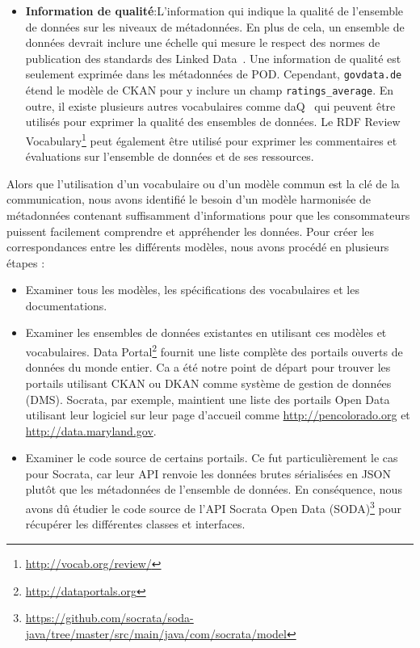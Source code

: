 \begin{itemize}
	\item \textbf{Information de qualit\'{e}}:L'information qui indique la qualit\'{e} de l'ensemble de donn\'{e}es sur les niveaux de m\'{e}tadonn\'{e}es. En plus de cela, un ensemble de donn\'{e}es devrait inclure une \'{e}chelle qui mesure le respect des normes de publication des standards des Linked Data~\cite{Berners-Lee:W3C:06}. Une information de qualit\'{e} est seulement exprim\'{e}e dans les m\'{e}tadonn\'{e}es de POD. Cependant, \texttt{govdata.de} \'{e}tend le mod\`{e}le de CKAN pour y inclure un champ \texttt{ratings\_average}. En outre, il existe plusieurs autres vocabulaires comme daQ~\cite{Debattista:WWW:14} qui peuvent \^{e}tre utilis\'{e}s pour exprimer la qualit\'{e} des ensembles de donn\'{e}es. Le RDF Review Vocabulary\footnote{\url{http://vocab.org/review/}} peut \'{e}galement \^{e}tre utilis\'{e} pour exprimer les commentaires et \'{e}valuations sur l'ensemble de donn\'{e}es et de ses ressources.
\end{itemize}

Alors que l'utilisation d'un vocabulaire ou d'un mod\`{e}le commun est la cl\'{e} de la communication, nous avons identifi\'{e} le besoin d'un mod\`{e}le harmonis\'{e}e de m\'{e}tadonn\'{e}es contenant suffisamment d'informations pour que les consommateurs puissent facilement comprendre et appr\'{e}hender les donn\'{e}es. Pour cr\'{e}er les correspondances entre les diff\'{e}rents mod\`{e}les, nous avons proc\'{e}d\'{e} en plusieurs \'{e}tapes :
\begin{itemize}
	\item Examiner tous les mod\`{e}les, les sp\'{e}cifications des vocabulaires et les documentations.
	\item Examiner les ensembles de donn\'{e}es existantes en utilisant ces mod\`{e}les et vocabulaires. Data Portal\footnote{\url{http://dataportals.org}} fournit une liste compl\`{e}te des portails ouverts de donn\'{e}es du monde entier. Ca a \'{e}t\'{e} notre point de d\'{e}part pour trouver les portails utilisant CKAN ou DKAN comme syst\`{e}me de gestion de donn\'{e}es (DMS). Socrata, par exemple, maintient une liste des portails Open Data utilisant leur logiciel sur leur page d'accueil comme \url{http://pencolorado.org} et \url{http://data.maryland.gov}.
	\item Examiner le code source de certains portails. Ce fut particuli\`{e}rement le cas pour Socrata, car leur API renvoie les donn\'{e}es brutes s\'{e}rialis\'{e}es en JSON plut\^{o}t que les m\'{e}tadonn\'{e}es de l'ensemble de donn\'{e}es. En cons\'{e}quence, nous avons dû \'{e}tudier le code source de l'API Socrata Open Data (SODA)\footnote{\url{https://github.com/socrata/soda-java/tree/master/src/main/java/com/socrata/model}} pour r\'{e}cup\'{e}rer les diff\'{e}rentes classes et interfaces.
\end{itemize}

